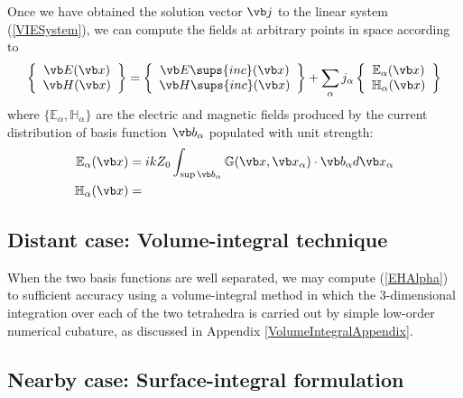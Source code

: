 \documentclass[letterpaper]{article}
\begin{document}
Once we have obtained the solution vector $\vb j$ to the 
linear system (\ref{VIESystem}), we can compute the fields
at arbitrary points in space according to 
$$ \left\{ \begin{array}{c} \vb E(\vb x) \\ 
                            \vb H(\vb x) 
           \end{array} 
   \right\}
   = 
   \left\{ \begin{array}{c} \vb E\sups{inc}(\vb x) \\ 
                            \vb H\sups{inc}(\vb x) 
           \end{array} 
   \right\}
  + 
  \sum_\alpha j_\alpha
   \left\{ \begin{array}{c} \mathbb{E}_\alpha(\vb x) \\ 
                            \mathbb{H}_\alpha(\vb x)
           \end{array} 
   \right\}
$$
where $\{\mathbb{E}_\alpha, \mathbb{H}_\alpha\}$ are the
electric and magnetic fields produced by the current distribution
of basis function $\vb b_\alpha$ populated with unit strength:
\begin{subequations}
\begin{align}
 \mathbb{E}_\alpha(\vb x)
&= ikZ_0 
   \int_{\sup \vb b_\alpha} \mathbb{G}(\vb x, \vb x_\alpha) \cdot \vb b_\alpha
   d\vb x_\alpha
\\
 \mathbb{H}_\alpha(\vb x)
&= 
\end{align}
\label{EHAlpha}
\end{subequations}

\subsection*{Distant case: Volume-integral technique}

When the two basis functions are well separated, 
we may compute (\ref{EHAlpha}) to sufficient accuracy using a volume-integral
method in which the 3-dimensional integration over each of the
two tetrahedra is carried out by simple low-order
numerical cubature, as discussed in Appendix \ref{VolumeIntegralAppendix}.

\subsection*{Nearby case: Surface-integral formulation}
\end{document}
